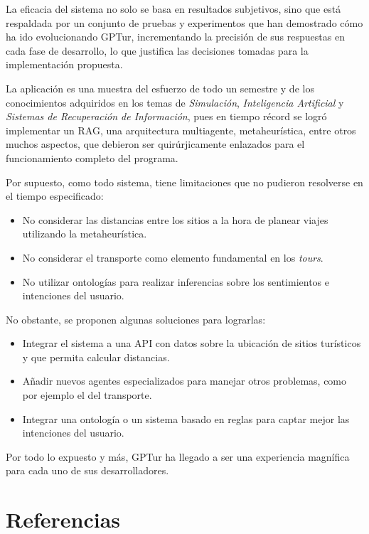 \documentclass[10pt]{llncs}
\begin{document}
La eficacia del sistema no solo se basa en resultados subjetivos, sino que está respaldada por un conjunto de pruebas y experimentos que han demostrado cómo ha ido evolucionando GPTur, incrementando la precisión de sus respuestas en cada fase 
de desarrollo, lo que justifica las decisiones tomadas para la implementación propuesta.

La aplicación es una muestra del esfuerzo de todo un semestre y de los conocimientos adquiridos en los temas de \textit{Simulación}, \textit{Inteligencia Artificial} y \textit{Sistemas de Recuperación de Información}, pues en tiempo récord se logró 
implementar un RAG, una arquitectura multiagente, metaheurística, entre otros muchos aspectos, que debieron ser quirúrjicamente enlazados para el funcionamiento completo del programa.

Por supuesto, como todo sistema, tiene limitaciones que no pudieron resolverse en el tiempo especificado:
\begin{itemize}
    \item No considerar las distancias entre los sitios a la hora de planear viajes utilizando la metaheurística.
    \item No considerar el transporte como elemento fundamental en los \textit{tours}.
    \item No utilizar ontologías para realizar inferencias sobre los sentimientos e intenciones del usuario.
\end{itemize}

No obstante, se proponen algunas soluciones para lograrlas:
\begin{itemize}
    \item Integrar el sistema a una API con datos sobre la ubicación de sitios turísticos y que permita calcular distancias.
    \item Añadir nuevos agentes especializados para manejar otros problemas, como por ejemplo el del transporte.
    \item Integrar una ontología o un sistema basado en reglas para captar mejor las intenciones del usuario.
\end{itemize}

Por todo lo expuesto y más, GPTur ha llegado a ser una experiencia magnífica para cada uno de sus desarrolladores.

\vspace{\baselineskip}
\section{Referencias}
\printbibliography
\end{document}
